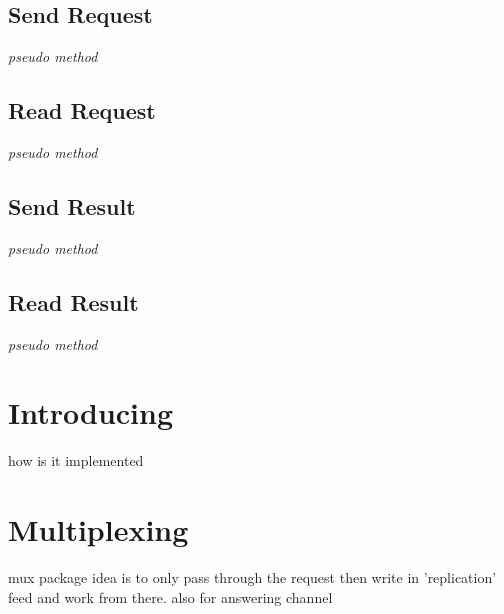 \subsection{Send Request}
\textit{pseudo method}
\subsection{Read Request}
\textit{pseudo method}
\subsection{Send Result}
\textit{pseudo method}
\subsection{Read Result}
\textit{pseudo method}
\section{Introducing}
how is it implemented

\section{Multiplexing}
mux package idea is to only pass through the request then write in 'replication' feed and work from there.
also for answering channel
